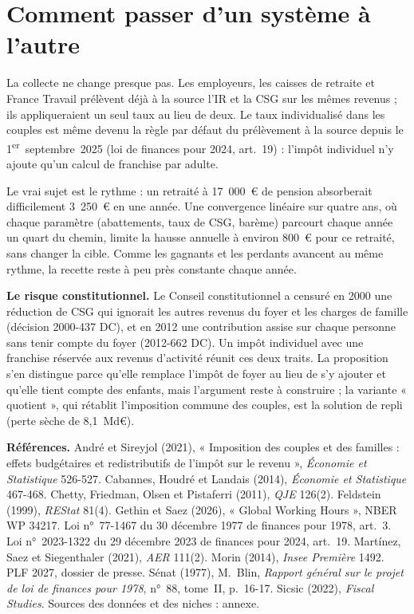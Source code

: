 \documentclass[11pt,a4paper]{article}
\begin{document}
\section{Comment passer d'un système à l'autre}

La collecte ne change presque pas. Les employeurs, les caisses de retraite et France Travail prélèvent déjà à
la source l'IR et la CSG sur les mêmes revenus ; ils appliqueraient un seul taux au lieu de deux. Le taux
individualisé dans les couples est même devenu la règle par défaut du prélèvement à la source depuis le
1\textsuperscript{er}~septembre~2025 (loi de finances pour 2024, art.~19) : l'impôt individuel n'y ajoute
qu'un calcul de franchise par adulte.

Le vrai sujet est le rythme : un retraité à 17~000~€ de pension absorberait difficilement 3~250~€ en une
année.
Une convergence linéaire sur quatre ans, où chaque paramètre (abattements, taux de CSG, barème) parcourt
chaque année un quart du chemin, limite la hausse annuelle à environ 800~€ pour ce retraité, sans changer
la cible. Comme les gagnants et les perdants avancent au même rythme, la recette reste à peu près
constante chaque année.

\textbf{Le risque constitutionnel.} Le Conseil constitutionnel a censuré en 2000 une réduction de CSG qui
ignorait les autres revenus du foyer et les charges de famille (décision 2000-437 DC), et en 2012 une
contribution assise sur chaque personne sans tenir compte du foyer (2012-662 DC). Un impôt individuel avec
une franchise réservée aux revenus d'activité réunit ces deux traits. La proposition s'en distingue parce
qu'elle remplace l'impôt de foyer au lieu de s'y ajouter et qu'elle tient compte des enfants, mais
l'argument reste à construire ; la variante « quotient », qui rétablit l'imposition commune des couples, est
la solution de repli (perte sèche de 8,1~Md€).

\vspace{6pt}
{\scriptsize\textbf{Références.} André et Sireyjol (2021), « Imposition des couples et des familles : effets
budgétaires et redistributifs de l'impôt sur le revenu », \emph{Économie et Statistique} 526-527.
Cabannes, Houdré et Landais (2014), \emph{Économie et Statistique} 467-468. Chetty, Friedman, Olsen et
Pistaferri (2011), \emph{QJE} 126(2). Feldstein (1999), \emph{REStat} 81(4). Gethin et Saez (2026),
« Global Working Hours », NBER WP 34217. Loi n°~77-1467 du 30 décembre 1977 de finances pour 1978,
art.~3. Loi n°~2023-1322 du 29 décembre 2023 de finances pour 2024, art.~19. Martínez, Saez et
Siegenthaler (2021), \emph{AER} 111(2). Morin (2014), \emph{Insee Première} 1492. PLF 2027, dossier de presse. Sénat (1977), M.~Blin, \emph{Rapport général sur le
projet de loi de finances pour 1978}, n°~88, tome~II, p.~16-17. Sicsic (2022), \emph{Fiscal Studies}.
Sources des données et des niches : annexe.\par}
\end{document}
